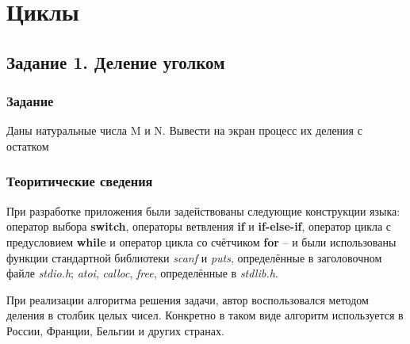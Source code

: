 \documentclass[12pt,a4paper]{report}
\begin{document}
\chapter{Циклы}
\section{Задание 1. Деление уголком}
\subsection{Задание}
\hspace{\parindent}
Даны натуральные числа M и N. Вывести на экран процесс их деления с остатком
\subsection{Теоритические сведения}
\hspace{\parindent}
При разработке приложения были задействованы следующие конструкции языка: оператор выбора \textbf{switch}, операторы ветвления \textbf{if} и \textbf{if-else-if}, оператор цикла с предусловием \textbf{while} и оператор цикла со счётчиком \textbf{for} -- и были использованы функции стандартной библиотеки \textit{scanf} и \textit{puts}, определённые в заголовочном файле \textit{stdio.h}; \textit{atoi}, \textit{calloc}, \textit{free}, определённые в \textit{stdlib.h}.

\hspace{\parindent}
При реализации алгоритма решения задачи, автор воспользовался методом деления в столбик целых чисел. Конкретно в таком виде алгоритм используется в России, Франции, Бельгии и других странах.
\end{document}
